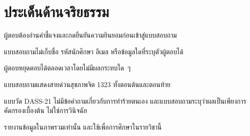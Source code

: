 \section{ประเด็นด้านจริยธรรม}

\begin{subitems}
    \item ผู้ตอบต้องอ่านคำชี้แจงและกดยืนยันความยินยอมก่อนเข้าสู่แบบสอบถาม
    \item แบบสอบถามไม่เก็บชื่อ รหัสนักศึกษา อีเมล หรือข้อมูลใดที่ระบุตัวผู้ตอบได้
    \item ผู้ตอบหยุดตอบได้ตลอดเวลาโดยไม่มีผลกระทบใด~ๆ
    \item แบบสอบถามแสดงสายด่วนสุขภาพจิต 1323 ทั้งตอนต้นและตอนท้าย
    \item แบบวัด DASS-21 ไม่มีข้อคำถามเกี่ยวกับการทำร้ายตนเอง และแบบสอบถามระบุว่าผลเป็นเพียงการคัดกรองเบื้องต้น ไม่ใช่การวินิจฉัย
    \item รายงานข้อมูลในภาพรวมเท่านั้น และใช้เพื่อการศึกษาในรายวิชานี้
\end{subitems}

